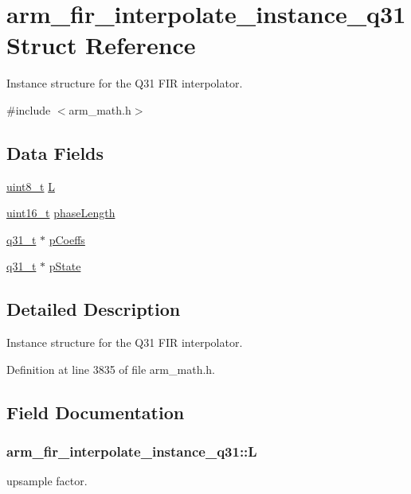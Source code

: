 \hypertarget{structarm__fir__interpolate__instance__q31}{\section{arm\-\_\-fir\-\_\-interpolate\-\_\-instance\-\_\-q31 Struct Reference}
\label{structarm__fir__interpolate__instance__q31}
}


Instance structure for the Q31 F\-I\-R interpolator.  




{\ttfamily \#include $<$arm\-\_\-math.\-h$>$}

\subsection*{Data Fields}
\begin{DoxyCompactItemize}
\item 
\hyperlink{stdint_8h_aba7bc1797add20fe3efdf37ced1182c5}{uint8\-\_\-t} \hyperlink{structarm__fir__interpolate__instance__q31_a5cdf0a631cb74e0e9588c388abe5235c}{L}
\item 
\hyperlink{stdint_8h_a273cf69d639a59973b6019625df33e30}{uint16\-\_\-t} \hyperlink{structarm__fir__interpolate__instance__q31_a5d243796584afc7cd6c557f00b7acca5}{phase\-Length}
\item 
\hyperlink{arm__math_8h_adc89a3547f5324b7b3b95adec3806bc0}{q31\-\_\-t} $\ast$ \hyperlink{structarm__fir__interpolate__instance__q31_afa719433687e1936ec3403d0d32f06e6}{p\-Coeffs}
\item 
\hyperlink{arm__math_8h_adc89a3547f5324b7b3b95adec3806bc0}{q31\-\_\-t} $\ast$ \hyperlink{structarm__fir__interpolate__instance__q31_addde04514b6e6ac72be3d609f0398b1a}{p\-State}
\end{DoxyCompactItemize}


\subsection{Detailed Description}
Instance structure for the Q31 F\-I\-R interpolator. 

Definition at line 3835 of file arm\-\_\-math.\-h.



\subsection{Field Documentation}
\hypertarget{structarm__fir__interpolate__instance__q31_a5cdf0a631cb74e0e9588c388abe5235c}{
\subsubsection[{L}]{ arm\-\_\-fir\-\_\-interpolate\-\_\-instance\-\_\-q31\-::\-L}}\label{structarm__fir__interpolate__instance__q31_a5cdf0a631cb74e0e9588c388abe5235c}
upsample factor. 

